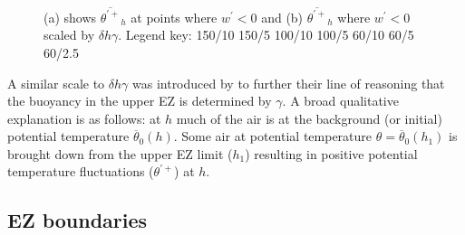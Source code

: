 \begin{figure}[htbp]
\begin{minipage}[b]{0.5\linewidth}
        \end{minipage}
        \caption[Downward moving positive potential temperature fluctuations at $h$]{(a) shows $\overline{\theta^{\prime+}}_{h}$ at points where $w^{\prime}<0$ and (b) $\overline{\theta^{\prime+}}_{h}$ where $w^{\prime}<0$ scaled by $\delta h \gamma$.  Legend key:{\color{red} } 150/10  150/5 \hspace{2mm} {\color{black} } 100/10 \hspace{2mm} {\color{black} } 100/5 \hspace{2mm} {\color{offyellow} } 60/10 \hspace{2mm} {\color{offyellow} } 60/5 \hspace{2mm} {\color{offyellow} } 60/2.5}
        \label{fig:downwarm_theta}
\end{figure}
\clearpage

A similar scale to $\delta h \gamma$ was introduced by \cite{GarciaMellado} to further their line of reasoning that the buoyancy in the upper EZ is determined by $\gamma$. A broad qualitative explanation is as follows: at $h$ much of the air is at the background (or initial) potential temperature $\overline{\theta}_{0}(h)$.  Some air at potential temperature $\theta = \overline{\theta}_{0}(h_{1})$ is brought down from the upper EZ limit ($h_{1}$) resulting in positive potential temperature fluctuations ($\theta^{'+}$) at $h$.\\

\subsection{EZ boundaries}

